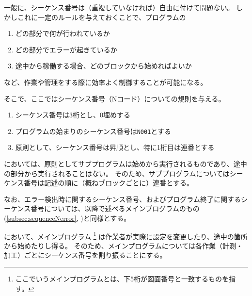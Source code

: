

一般に、シーケンス番号は（重複していなければ）自由に付けて問題ない。
しかしこれに一定のルールを与えておくことで、プログラムの
\begin{enumerate}
\item どの部分で何が行われているか
\item どの部分でエラーが起きているか
\item 途中から稼働する場合、どのブロックから始めればよいか
\end{enumerate}
など、作業や管理をする際に効率よく制御することが可能になる。

そこで、ここではシーケンス番号（Nコード）についての規則を与える。



\begin{enumerate}[label=\Roman*), ref=\Roman*)]
\item シーケンス番号は3桁とし、0埋めする
\item プログラムの始まりのシーケンス番号は\verb|N001|とする
\item 原則として、シーケンス番号は昇順とし、特に1桁目は連番とする
\end{enumerate}


\DMname においては、原則としてサブプログラムは始めから実行されるものであり、途中の部分から実行されることはない。
そのため、サブプログラムについてはシーケンス番号は記述の順に（概ねブロックごとに）連番とする。

なお、エラー検出時に関するシーケンス番号、およびプログラム終了に関するシーケンス番号については、以降で述べるメインプログラムのもの(\autoref{subsec:sequenceNerror}, )と同様とする。



\clearpage
\DMname において、メインプログラム
\footnote{ここでいうメインプログラムとは、下5桁が図面番号と一致するものを指す。}
は作業者が実際に設定を変更したり、途中の箇所から始めたりし得る。
そのため、メインプログラムについては各作業（計測・加工）ごとにシーケンス番号を割り振ることにする。


